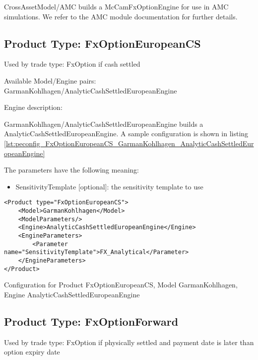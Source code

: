 CrossAssetModel/AMC builds a McCamFxOptionEngine for use in AMC simulations. We refer to the AMC module documentation
for further details.

\subsection{Product Type: FxOptionEuropeanCS}

Used by trade type: FxOption if cash settled

Available Model/Engine pairs: GarmanKohlhagen/AnalyticCashSettledEuropeanEngine

Engine description:

GarmanKohlhagen/AnalyticCashSettledEuropeanEngine builds a AnalyticCashSettledEuropeanEngine. A sample configuration is shown in listing
\ref{lst:peconfig_FxOptionEuropeanCS_GarmanKohlhagen_AnalyticCashSettledEuropeanEngine}

The parameters have the following meaning:

\begin{itemize}
\item SensitivityTemplate [optional]: the sensitivity template to use 
\end{itemize}

\begin{longlisting}
\begin{verbatim}
<Product type="FxOptionEuropeanCS">
    <Model>GarmanKohlhagen</Model>
    <ModelParameters/>
    <Engine>AnalyticCashSettledEuropeanEngine</Engine>
    <EngineParameters>
        <Parameter name="SensitivityTemplate">FX_Analytical</Parameter>
    </EngineParameters>
</Product>
\end{verbatim}
\caption{Configuration for Product FxOptionEuropeanCS, Model GarmanKohlhagen, Engine AnalyticCashSettledEuropeanEngine}
\label{lst:peconfig_FxOptionEuropeanCS_GarmanKohlhagen_AnalyticCashSettledEuropeanEngine}
\end{longlisting}

\subsection{Product Type: FxOptionForward}

Used by trade type: FxOption if physically settled and payment date is later than option expiry date

